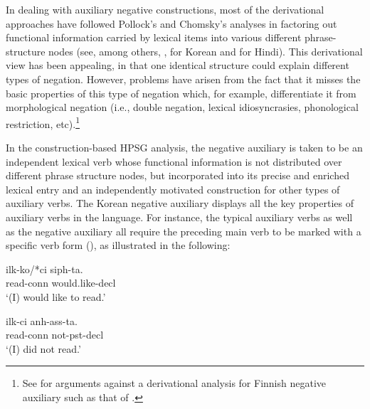 \documentclass[output=paper]{langsci/langscibook}
\begin{document}
In dealing with auxiliary negative constructions,
most of the derivational approaches have
followed Pollock's and Chomsky's analyses in factoring out functional
information carried by lexical items into
various different phrase-structure nodes (see, among others, \citet{Hagstrom:97,Hagstrom:02}, \citet{Han:07} for Korean and \citet{Vasishth:00} for Hindi).
%
%
This derivational view has
been appealing, in that one identical structure could explain
different types of negation.   However,
problems have arisen from the fact that it misses the basic properties
of this type of negation which, for example, differentiate it from
morphological negation (i.e., double negation, lexical
idiosyncrasies, phonological restriction, etc).\footnote{See \citet{Nino:94} for arguments against a derivational analysis
for Finnish negative auxiliary such as that of \citet{Mitchell:91}.}


In the construction-based HPSG analysis, the
negative auxiliary is taken to be an independent lexical
verb whose functional information is not distributed
over different phrase structure nodes, but incorporated into
its precise and enriched lexical entry and an independently
motivated construction for other types of auxiliary verbs.
The Korean negative auxiliary displays all the key properties of auxiliary verbs in the language. For instance, the typical auxiliary verbs as
well as the negative auxiliary all require the preceding main verb to be marked with a specific verb form (\vform), as illustrated
in the following:





\begin{exe}
\ex \begin{xlist}
\ex \label{14a}\gll ilk-ko/*ci siph-ta. \\
read-{\sc conn} would.like-{\sc decl} \\
`(I) would like to read.'

\ex \label{14b}\gll ilk-ci anh-ass-ta. \\
read-{\sc conn} not-{\sc pst}-{\sc decl} \\
`(I) did not read.'
\end{xlist}\end{exe}
\end{document}
